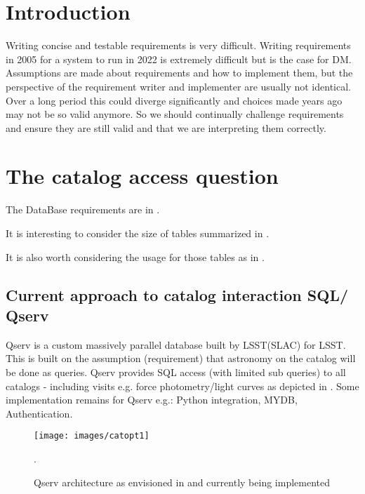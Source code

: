 \section{Introduction} \label{sec:intro}
 Writing concise and testable requirements is very difficult.
 Writing requirements in 2005 for a system to run in 2022 is extremely difficult but is the case for DM.
Assumptions are made about requirements and how to implement them, but
the perspective of the requirement writer and implementer are usually not identical.
Over a long period this could diverge significantly and  choices made years ago may not be so valid anymore.
So we should continually challenge requirements and ensure they are still valid and that we are interpreting them correctly.


\section{The catalog  access  question}\label{sec:cat}
The DataBase requirements are in .

It is interesting to consider the size of tables summarized in .


It is also worth considering the usage for those tables as in .

\subsection{Current approach to catalog interaction SQL/ Qserv}
\label{sec:qserv}
Qserv is a custom massively parallel database built  by LSST(SLAC) for LSST.
This is built on the assumption (requirement) that astronomy on the catalog will be done as queries.
Qserv provides SQL access (with limited sub queries) to all catalogs - including visits e.g. force photometry/light curves as depicted in .
Some implementation remains for Qserv e.g.: Python integration, MYDB, Authentication.

\begin{figure}
\begin{center}
 \texttt{[image: images/catopt1]}
\caption{Qserv architecture as envisioned in   and currently being implemented \label{fig:catopt1}}.
\end{center}
\end{figure}

